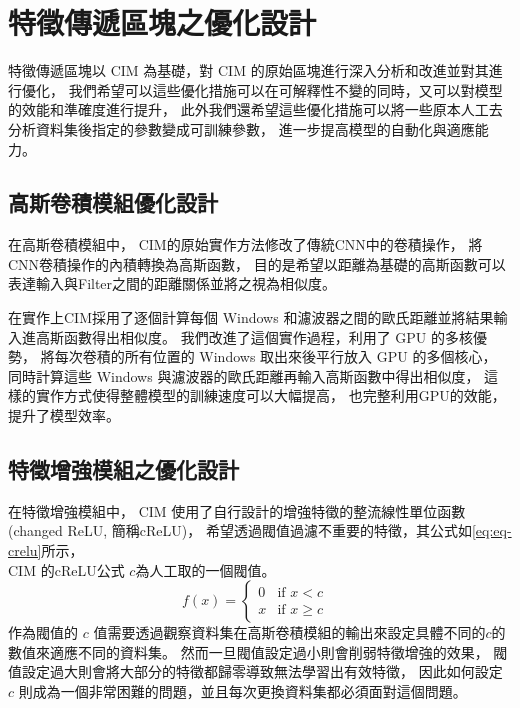 \documentclass[class=NCU_thesis, crop=false]{standalone}
\begin{document}
\pagebreak
\section{特徵傳遞區塊之優化設計}
\label{chapter:chapter3.4}
特徵傳遞區塊以 CIM 為基礎，對 CIM 的原始區塊進行深入分析和改進並對其進行優化，
我們希望可以這些優化措施可以在可解釋性不變的同時，又可以對模型的效能和準確度進行提升，
此外我們還希望這些優化措施可以將一些原本人工去分析資料集後指定的參數變成可訓練參數，
進一步提高模型的自動化與適應能力。

	\subsection{高斯卷積模組優化設計}
	在高斯卷積模組中，
	CIM的原始實作方法修改了傳統CNN\cite{726791}中的卷積操作，
	將CNN卷積操作的內積轉換為高斯函數，
	目的是希望以距離為基礎的高斯函數可以表達輸入與Filter之間的距離關係並將之視為相似度。

	在實作上CIM採用了逐個計算每個 Windows 和濾波器之間的歐氏距離並將結果輸入進高斯函數得出相似度。
	我們改進了這個實作過程，利用了 GPU 的多核優勢，
	將每次卷積的所有位置的 Windows 取出來後平行放入 GPU 的多個核心，
	同時計算這些 Windows 與濾波器的歐氏距離再輸入高斯函數中得出相似度，
	這樣的實作方式使得整體模型的訓練速度可以大幅提高，
	也完整利用GPU的效能，提升了模型效率。

	\pagebreak

	\subsection{特徵增強模組之優化設計}
	在特徵增強模組中，
	CIM 使用了自行設計的增強特徵的整流線性單位函數(changed ReLU, 簡稱cReLU)，
	希望透過閥值過濾不重要的特徵，其公式如\cref{eq:eq-crelu}所示，\\
	CIM 的cReLU公式\cite{YangCNNInterpretable} $c$為人工取的一個閥值。
	\begin{equation}
	    \label{eq:eq-crelu}
	    f(x)= 
	    \begin{cases}
	        0 & \text{if  $x < c$ }\\
	        x & \text{if  $x \geq c$}
	    \end{cases}
	\end{equation}
	作為閥值的 $c$ 值需要透過觀察資料集在高斯卷積模組的輸出來設定具體不同的$c$的數值來適應不同的資料集。
	然而一旦閥值設定過小則會削弱特徵增強的效果，
	閥值設定過大則會將大部分的特徵都歸零導致無法學習出有效特徵，
	因此如何設定 $c$ 則成為一個非常困難的問題，並且每次更換資料集都必須面對這個問題。
\end{document}
